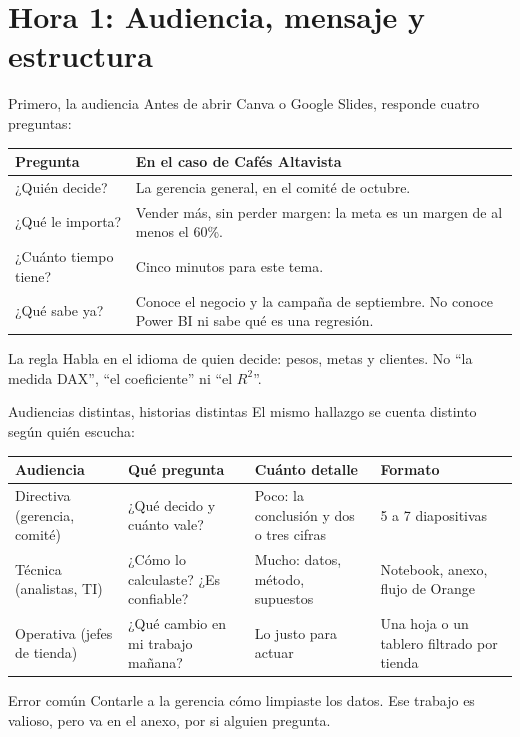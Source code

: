 \documentclass[aspectratio=169,11pt]{beamer}
\begin{document}
\section{Hora 1: Audiencia, mensaje y estructura}
\begin{frame}[t]{Primero, la audiencia}
  \small Antes de abrir Canva o Google Slides, responde cuatro preguntas:
  \vspace{0.1cm}

  \footnotesize
  \renewcommand{\arraystretch}{1.3}
  \begin{tabular}{@{}L{3.4cm}L{10.1cm}@{}}
    \toprule
    \textbf{Pregunta} & \textbf{En el caso de Cafés Altavista} \\
    \midrule
    ¿Quién decide? & La gerencia general, en el comité de octubre. \\
    ¿Qué le importa? & Vender más, sin perder margen: la meta es un margen de al menos el 60\%. \\
    ¿Cuánto tiempo tiene? & Cinco minutos para este tema. \\
    ¿Qué sabe ya? & Conoce el negocio y la campaña de septiembre. No conoce Power BI ni sabe qué es una regresión. \\
    \bottomrule
  \end{tabular}
  \vspace{0.2cm}
  \begin{alertblock}{La regla}
    \footnotesize Habla en el idioma de quien decide: pesos, metas y
    clientes. No ``la medida DAX'', ``el coeficiente'' ni ``el $R^2$''.
  \end{alertblock}
\end{frame}

\begin{frame}[t]{Audiencias distintas, historias distintas}
  \small El mismo hallazgo se cuenta distinto según quién escucha:
  \vspace{0.1cm}

  \footnotesize
  \renewcommand{\arraystretch}{1.3}
  \begin{tabular}{@{}L{2.3cm}L{3.7cm}L{3.5cm}L{3.1cm}@{}}
    \toprule
    \textbf{Audiencia} & \textbf{Qué pregunta} & \textbf{Cuánto detalle} & \textbf{Formato} \\
    \midrule
    Directiva (gerencia, comité) & ¿Qué decido y cuánto vale? & Poco: la conclusión y dos o tres cifras & 5 a 7 diapositivas \\
    Técnica (analistas, TI) & ¿Cómo lo calculaste? ¿Es confiable? & Mucho: datos, método, supuestos & Notebook, anexo, flujo de Orange \\
    Operativa (jefes de tienda) & ¿Qué cambio en mi trabajo mañana? & Lo justo para actuar & Una hoja o un tablero filtrado por tienda \\
    \bottomrule
  \end{tabular}
  \vspace{0.2cm}
  \begin{alertblock}{Error común}
    \footnotesize Contarle a la gerencia cómo limpiaste los datos. Ese
    trabajo es valioso, pero va en el anexo, por si alguien pregunta.
  \end{alertblock}
\end{frame}
\end{document}
